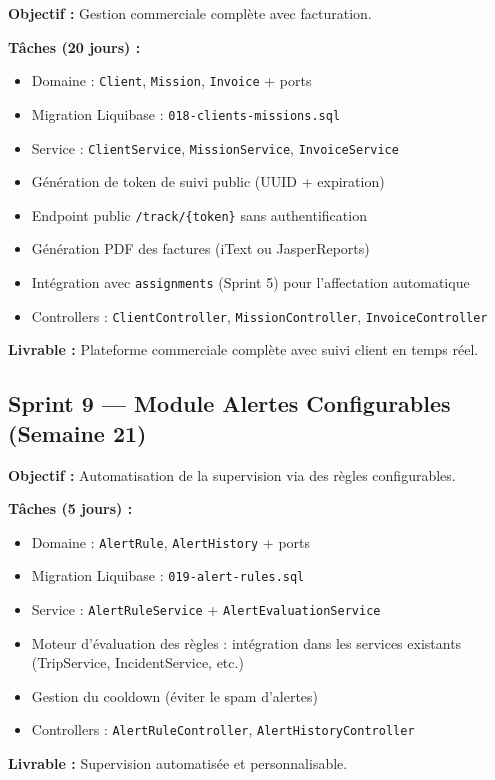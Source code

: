\documentclass[12pt,a4paper]{report}
\begin{document}
\begin{tcolorbox}[colback=fleetsuccess!5, colframe=fleetsuccess, title={\bfseries Sprint 8 — Clients, Missions et Facturation}]
\textbf{Objectif :} Gestion commerciale complète avec facturation.

\textbf{Tâches (20 jours) :}
\begin{itemize}[leftmargin=1.5cm]
  \item Domaine : \texttt{Client}, \texttt{Mission}, \texttt{Invoice} + ports
  \item Migration Liquibase : \texttt{018-clients-missions.sql}
  \item Service : \texttt{ClientService}, \texttt{MissionService}, \texttt{InvoiceService}
  \item Génération de token de suivi public (UUID + expiration)
  \item Endpoint public \texttt{/track/\{token\}} sans authentification
  \item Génération PDF des factures (iText ou JasperReports)
  \item Intégration avec \texttt{assignments} (Sprint 5) pour l'affectation automatique
  \item Controllers : \texttt{ClientController}, \texttt{MissionController}, \texttt{InvoiceController}
\end{itemize}

\textbf{Livrable :} Plateforme commerciale complète avec suivi client en temps réel.
\end{tcolorbox}

\subsection{Sprint 9 — Module Alertes Configurables (Semaine 21)}

\begin{tcolorbox}[colback=fleeterror!5, colframe=fleeterror, title={\bfseries Sprint 9 — Alertes et Règles Métier}]
\textbf{Objectif :} Automatisation de la supervision via des règles configurables.

\textbf{Tâches (5 jours) :}
\begin{itemize}[leftmargin=1.5cm]
  \item Domaine : \texttt{AlertRule}, \texttt{AlertHistory} + ports
  \item Migration Liquibase : \texttt{019-alert-rules.sql}
  \item Service : \texttt{AlertRuleService} + \texttt{AlertEvaluationService}
  \item Moteur d'évaluation des règles : intégration dans les services existants (TripService, IncidentService, etc.)
  \item Gestion du cooldown (éviter le spam d'alertes)
  \item Controllers : \texttt{AlertRuleController}, \texttt{AlertHistoryController}
\end{itemize}

\textbf{Livrable :} Supervision automatisée et personnalisable.
\end{tcolorbox}
\end{document}
